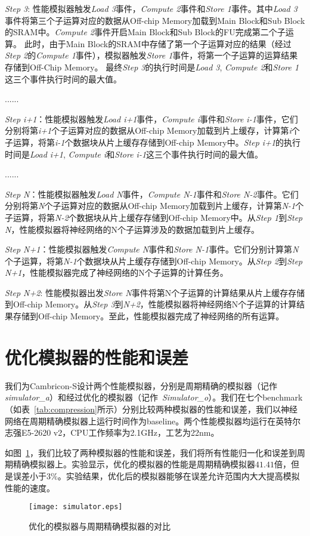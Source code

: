 \emph{Step 3}: 性能模拟器触发\emph{Load 3}事件，\emph{Compute 2}事件和\emph{Store 1}事件。其中\emph{Load 3}事件将第三个子运算对应的数据从Off-chip Memory加载到Main Block和Sub Block的SRAM中。\emph{Compute 2}事件开启Main Block和Sub Block的FU完成第二个子运算。 此时，由于Main Block的SRAM中存储了第一个子运算对应的结果（经过\emph{Step 2}的\emph{Compute 1}事件），模拟器触发\emph{Store 1}事件，将第一个子运算的运算结果存储到Off-Chip Memory。
最终\emph{Step 3}的执行时间是\emph{Load 3}, \emph{Compute 2}和\emph{Store 1}这三个事件执行时间的最大值。

......

\emph{Step i+1}：性能模拟器触发\emph{Load i+1}事件，\emph{Compute i}事件和\emph{Store i-1}事件，它们分别将第\emph{i+1}个子运算对应的数据从Off-chip Memory加载到片上缓存，计算第\emph{i}个子运算，将第\emph{i-1}个数据块从片上缓存存储到Off-chip Memory中。\emph{Step i+1}的执行时间是\emph{Load i+1}, \emph{Compute i}和\emph{Store i-1}这三个事件执行时间的最大值。

......

\emph{Step N}：性能模拟器触发\emph{Load N}事件，\emph{Compute N-1}事件和\emph{Store N-2}事件。它们分别将第\emph{N}个子运算对应的数据从Off-chip Memory加载到片上缓存，计算第\emph{N-1}个子运算，将第\emph{N-2}个数据块从片上缓存存储到Off-chip Memory中。从\emph{Step 1}到\emph{Step N}，性能模拟器将神经网络的N个子运算涉及的数据加载到片上缓存。

\emph{Step N+1}：性能模拟器触发\emph{Compute N}事件和\emph{Store N-1}事件。它们分别计算第\emph{N}个子运算，将第\emph{N-1}个数据块从片上缓存存储到Off-chip Memory。从\emph{Step 2}到\emph{Step N+1}，性能模拟器完成了神经网络的N个子运算的计算任务。

\emph{Step N+2}: 性能模拟器出发\emph{Store N}事件将第N个子运算的计算结果从片上缓存存储到Off-chip Memory。从\emph{Step 3}到\emph{N+2}，性能模拟器将神经网络N个子运算的计算结果存储到Off-chip Memory。至此，性能模拟器完成了神经网络的所有运算。

\section{优化模拟器的性能和误差}
我们为Cambricon-S设计两个性能模拟器，分别是周期精确的模拟器（记作\emph{simulator\_a}）和经过优化的模拟器（记作~\emph{Simulator\_o}）。我们在七个benchmark（如表~\ref{tab:compression}所示）分别比较两种模拟器的性能和误差，我们以神经网络在周期精确模拟器上运行时间作为baseline。两个性能模拟器均运行在英特尔志强E5-2620 v2，CPU工作频率为2.1GHz，工艺为22nm。

如图~\ref{fig:simulator1}，我们比较了两种模拟器的性能和误差，我们将所有性能归一化和误差到周期精确模拟器上。实验显示，优化的模拟器的性能是周期精确模拟器$41.41$倍，但是误差小于$3\%$。实验结果，优化后的模拟器能够在误差允许范围内大大提高模拟性能的速度。

\begin{figure}[h]
\centering
\texttt{[image: simulator.eps]}
\caption{优化的模拟器与周期精确模拟器的对比}
\label{fig:simulator1}
\end{figure}



